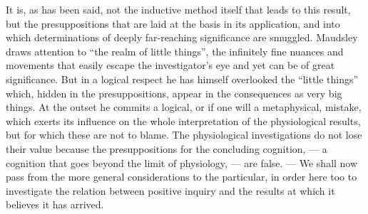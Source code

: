 \documentclass[12pt,a4paper,openany]{book}
\begin{document}
It is, as has been said, not the inductive method itself that
leads to this result, but the presuppositions that are laid at
the basis in its application, and into which
determinations of deeply far-reaching significance are smuggled. Maudsley
draws attention to ``the realm of little things'', the
infinitely fine nuances and movements that easily escape the investigator's
eye and yet can be of great significance. But
in a logical respect he has himself overlooked the ``little things''
which, hidden in the presuppositions, appear in the consequences
as very big things. At the outset he commits a
logical, or if one will a metaphysical, mistake, which exerts
its influence on the whole interpretation of the physiological
results, but for which these are not to blame. The physiological
investigations do not lose their value because the presuppositions
for the concluding cognition, --- a cognition that goes
beyond the limit of physiology, --- are false. --- We shall
now pass from the more general considerations to the particular,
in order here too to investigate the relation between
positive inquiry and the results at which it believes it
has arrived.
\end{document}

